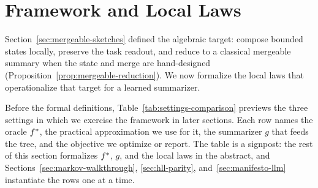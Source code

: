 \section{Framework and Local Laws}\label{sec:framework}

Section~\ref{sec:mergeable-sketches} defined the algebraic target:
compose bounded states locally, preserve the task readout, and reduce to a
classical mergeable summary when the state and merge are hand-designed
(Proposition~\ref{prop:mergeable-reduction}). We now formalize the local
laws that operationalize that target for a learned summarizer.

Before the formal definitions, Table~\ref{tab:settings-comparison} previews the three settings in which we exercise the framework in later sections. Each row names the oracle $f^\ast$, the practical approximation we use for it, the summarizer $g$ that feeds the tree, and the objective we optimize or report. The table is a signpost: the rest of this section formalizes $f^\ast$, $g$, and the local laws in the abstract, and Sections~\ref{sec:markov-walkthrough}, \ref{sec:hll-parity}, and~\ref{sec:manifesto-llm} instantiate the rows one at a time.

